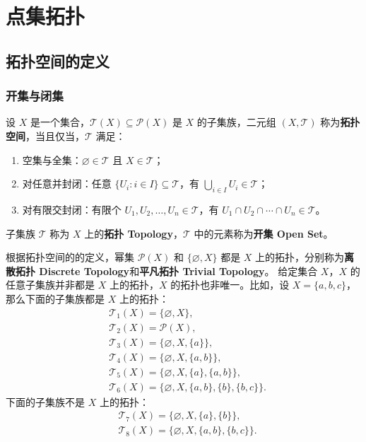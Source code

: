 \chapter{点集拓扑}

\section{拓扑空间的定义}

\subsection{开集与闭集}
\begin{definition}
    设 $ X $ 是一个集合，$ \mathcal{T}(X) \subseteq \mathcal{P}(X) $ 是 $ X $ 的子集族，二元组 $ (X,\mathcal{T}) $ 称为\textbf{拓扑空间}，当且仅当，$ \mathcal{T} $ 满足：
    \begin{enumerate}
        \item 空集与全集：$ \varnothing \in \mathcal{T} $ 且 $ X \in \mathcal{T} $；
        \item 对任意并封闭：任意 $ \{U_i:i\in I\} \subseteq \mathcal{T} $，有 $ \bigcup_{i\in I} U_i \in \mathcal{T} $；
        \item 对有限交封闭：有限个 $ U_1,U_2,\ldots,U_n\in \mathcal{T} $，有 $ U_1\cap U_2\cap \cdots \cap U_n \in \mathcal{T} $。
    \end{enumerate}
    子集族 $ \mathcal{T} $ 称为 $ X $ 上的\textbf{拓扑 Topology}，$ \mathcal{T} $ 中的元素称为\textbf{开集 Open Set}。
    \label{definition:topological_space}
\end{definition}

\begin{note}
    根据拓扑空间的的定义，幂集 $ \mathcal{P}(X) $ 和 $ \{\varnothing,X\} $ 都是 $ X $ 上的拓扑，分别称为\textbf{离散拓扑 Discrete Topology}和\textbf{平凡拓扑 Trivial Topology}。
    给定集合 $X$，$X$ 的任意子集族并非都是 $X$ 上的拓扑，$X$ 的拓扑也非唯一。比如，设 $ X=\{a,b,c\} $，那么下面的子集族都是 $ X $ 上的拓扑：
    \begin{align*}
        &\mathcal{T}_1(X)=\{\varnothing,X\},\\
        &\mathcal{T}_2(X)=\mathcal{P}(X),\\
        &\mathcal{T}_3(X)=\{\varnothing,X,\{a\}\},\\
        &\mathcal{T}_4(X)=\{\varnothing,X,\{a,b\}\},\\
        &\mathcal{T}_5(X)=\{\varnothing,X,\{a\},\{a,b\}\},\\
        &\mathcal{T}_6(X)=\{\varnothing,X,\{a,b\},\{b\},\{b,c\}\}.
    \end{align*}
    下面的子集族不是 $ X $ 上的拓扑：
    \begin{align*}
        &\mathcal{T}_7(X)=\{\varnothing,X,\{a\},\{b\}\},\\
        &\mathcal{T}_8(X)=\{\varnothing,X,\{a,b\},\{b,c\}\}.
    \end{align*}
\end{note}
\vspace{1em}

